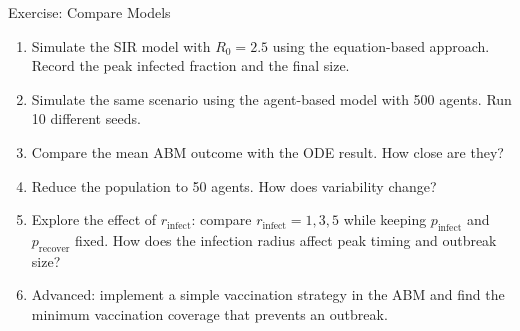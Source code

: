 \begin{frame}{Exercise: Compare Models}
  \begin{enumerate}
    \item Simulate the SIR model with $R_0 = 2.5$ using the equation-based approach. Record the peak infected fraction and the final size.
    \item Simulate the same scenario using the agent-based model with 500 agents. Run 10 different seeds.
    \item Compare the mean ABM outcome with the ODE result. How close are they?
    \item Reduce the population to 50 agents. How does variability change?
    \item Explore the effect of $r_{\text{infect}}$: compare $r_{\text{infect}} = 1, 3, 5$ while keeping $p_{\text{infect}}$ and $p_{\text{recover}}$ fixed. How does the infection radius affect peak timing and outbreak size?
    \item Advanced: implement a simple vaccination strategy in the ABM and find the minimum vaccination coverage that prevents an outbreak.
  \end{enumerate}
\end{frame}
